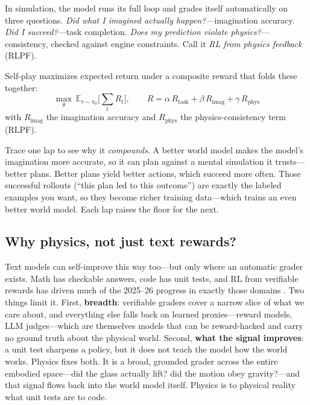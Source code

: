 \documentclass[10pt,conference]{IEEEtran}
\begin{document}
In simulation, the model runs its full loop and grades itself automatically on
three questions. \emph{Did what I imagined actually happen?}---imagination
accuracy. \emph{Did I succeed?}---task completion. \emph{Does my prediction
violate physics?}---consistency, checked against engine constraints. Call it
\emph{RL from physics feedback} (RLPF).

Self-play maximizes expected return under a composite reward that folds these
together:
\begin{equation}
\max_{\theta}\ \mathbb{E}_{\tau\sim\pi_\theta}\!\Big[\textstyle\sum_t R_t\Big],
\qquad R = \alpha\,R_{\text{task}} + \beta\,R_{\text{imag}} + \gamma\,R_{\text{phys}}
\end{equation}
with $R_{\text{imag}}$ the imagination accuracy and $R_{\text{phys}}$ the
physics-consistency term (RLPF).

Trace one lap to see why it \emph{compounds}. A better world model makes the
model's imagination more accurate, so it can plan against a mental simulation it
trusts---better plans. Better plans yield better actions, which succeed more
often. Those successful rollouts (``this plan led to this outcome'') are exactly
the labeled examples you want, so they become richer training data---which trains
an even better world model. Each lap raises the floor for the next.

\subsection{Why physics, not just text rewards?}
Text models can self-improve this way too---but only where an automatic grader
exists. Math has checkable answers, code has unit tests, and RL from verifiable
rewards has driven much of the 2025--26 progress in exactly those domains
\cite{ref29,ref31,ref32,ref34}. Two things limit it. First, \textbf{breadth}: verifiable graders
cover a narrow slice of what we care about, and everything else falls back on
learned proxies---reward models, LLM judges---which are themselves models that can
be reward-hacked and carry no ground truth about the physical world. Second,
\textbf{what the signal improves}: a unit test sharpens a policy, but it does not
teach the model how the world works. Physics fixes both. It is a broad, grounded
grader across the entire embodied space---did the glass actually lift? did the
motion obey gravity?---and that signal flows back into the world model itself.
Physics is to physical reality what unit tests are to code.
\end{document}
